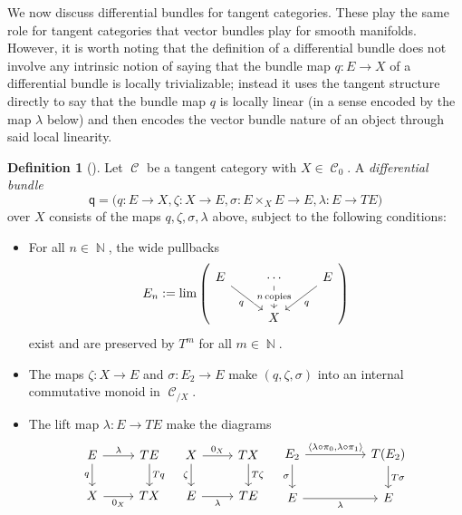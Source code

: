 \documentclass{amsart}
\theoremstyle{definition}
\newtheorem{definition}[equation]{Definition}
\DeclareMathOperator{\Cscr}{\mathscr{C}}
\DeclareMathOperator{\N}{\mathbb{N}}
\numberwithin{equation}{subsection}
\begin{document}
We now discuss differential bundles for tangent categories. These play the same role for tangent categories that vector bundles play for smooth manifolds. However, it is worth noting that the definition of a differential bundle does not involve any intrinsic notion of saying that the bundle map $q:E \to X$ of a differential bundle is locally trivializable; instead it uses the tangent structure directly to say that the bundle map $q$ is locally linear (in a sense encoded by the map $\lambda$ below) and then encodes the vector bundle nature of an object through said local linearity.


\begin{definition}[{\cite[Definition 2.3]{GeoffRobinBundle}}]\label{Defn: Section Tangent: Differential Bundle}
	Let $\Cscr$ be a tangent category with $X \in \Cscr_0$. A \emph{differential bundle} 
	\[
	\mathsf{q} = \bigg(q:E \to X, \zeta:X \to E, \sigma:E \times_X E \to E, \lambda:E \to TE\bigg)
	\]
	over $X$ consists of the maps $q, \zeta, \sigma, \lambda$ above, subject to the following conditions:
	\begin{itemize}
		\item For all $n \in \N$, the wide pullbacks
		\[
		E_n := \lim\left(\begin{tikzcd}
			E \ar[dr, swap]{}{q} & \cdots \ar[d]{}[description]{n\,\text{copies}} & E \ar[dl]{}{q} \\
			& X
		\end{tikzcd}\right)
		\]
		exist and are preserved by $T^m$ for all $m \in \N$.
		\item The maps $\zeta:X \to E$ and $\sigma:E_2 \to E$ make $(q,\zeta,\sigma)$ into an internal commutative monoid in $\Cscr_{/X}$.
		\item The lift map $\lambda:E \to TE$ make the diagrams
		\[
		\begin{tikzcd}
			E \ar[r]{}{\lambda} \ar[d, swap]{}{q} & TE \ar[d]{}{Tq} \\
			X \ar[r, swap]{}{0_X} & TX
		\end{tikzcd}\quad
		\begin{tikzcd}
			X \ar[d, swap]{}{\zeta} \ar[r]{}{0_X} & TX \ar[d]{}{T\zeta} \\
			E \ar[r,swap]{}{\lambda} & TE
		\end{tikzcd}\quad
		\begin{tikzcd}
			E_2 \ar[rr]{}{\langle \lambda \circ \pi_0, \lambda \circ \pi_1\rangle} \ar[d, swap]{}{\sigma} & & T(E_2) \ar[d]{}{T\sigma} \\
			E \ar[rr, swap]{}{\lambda} & & E

\end{tikzcd}\]
\end{itemize}
\end{definition}
\end{document}
